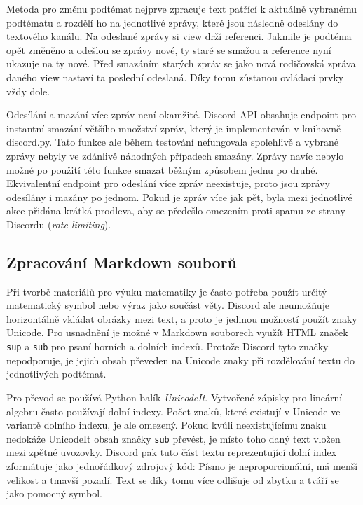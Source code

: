 \documentclass[FM]{tulthesis}
\begin{document}
	Metoda pro změnu podtémat nejprve zpracuje text patřící k aktuálně vybranému podtématu a rozdělí ho na jednotlivé zprávy, které jsou následně odeslány do textového kanálu. Na odeslané zprávy si view drží referenci. Jakmile je podtéma opět změněno a odešlou se zprávy nové, ty staré se smažou a reference nyní ukazuje na ty nové. Před smazáním starých zpráv se jako nová rodičovská zpráva daného view nastaví ta poslední odeslaná. Díky tomu zůstanou ovládací prvky vždy dole.
	
	Odesílání a mazání více zpráv není okamžité. Discord API obsahuje endpoint pro instantní smazání většího množství zpráv, který je implementován v knihovně discord.py. Tato funkce ale během testování nefungovala spolehlivě a vybrané zprávy nebyly ve zdánlivě náhodných případech smazány. Zprávy navíc nebylo možné po použití této funkce smazat běžným způsobem jednu po druhé. Ekvivalentní endpoint pro odeslání více zpráv neexistuje, proto jsou zprávy odesílány i mazány po jednom. Pokud je zpráv více jak pět, byla mezi jednotlivé akce přidána krátká prodleva, aby se předešlo omezením proti spamu ze strany Discordu (\textit{rate limiting}).
		
	
	\subsection{Zpracování Markdown souborů}
	
	Při tvorbě materiálů pro výuku matematiky je často potřeba použít určitý matematický symbol nebo výraz jako součást věty. Discord ale neumožňuje horizontálně vkládat obrázky mezi text, a proto je jedinou možností použít znaky Unicode. Pro usnadnění je možné v Markdown souborech využít HTML značek \verb|sup| a \verb|sub| pro psaní horních a dolních indexů. Protože Discord tyto značky nepodporuje, je jejich obsah převeden na Unicode znaky při rozdělování textu do jednotlivých podtémat.
	
	Pro převod se používá Python balík \textit{UnicodeIt}. Vytvořené zápisky pro lineární algebru často používají dolní indexy. Počet znaků, které existují v Unicode ve variantě dolního indexu, je ale omezený. Pokud kvůli neexistujícímu znaku nedokáže UnicodeIt obsah značky \verb|sub| převést, je místo toho daný text vložen mezi zpětné uvozovky. Discord pak tuto část textu reprezentující dolní index zformátuje jako jednořádkový zdrojový kód: Písmo je neproporcionální, má menší velikost a tmavší pozadí. Text se díky tomu více odlišuje od zbytku a tváří se jako pomocný symbol.
	
\end{document}
